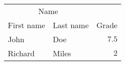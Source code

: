 \documentclass[utf8]{ctexart}
\begin{document}
\begin{tabular}{llr}
  \toprule
  \multicolumn{2}{c}{Name} \\
  \cmidrule(r){1-2}
  First name & Last name & Grade \\
  \midrule
  John & Doe & $7.5$ \\
  \midrule
  Richard & Miles & $2$\\
  \bottomrule
\end{tabular}
\end{document}
